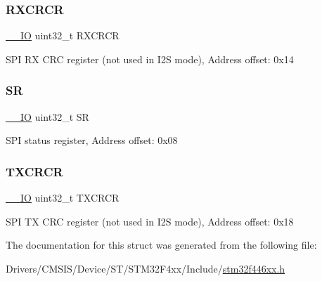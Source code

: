 \subsubsection{\texorpdfstring{R\+X\+C\+R\+CR}{RXCRCR}}
{\footnotesize\ttfamily \mbox{\hyperlink{core__sc300_8h_aec43007d9998a0a0e01faede4133d6be}{\+\_\+\+\_\+\+IO}} uint32\+\_\+t R\+X\+C\+R\+CR}

S\+PI RX C\+RC register (not used in I2S mode), Address offset\+: 0x14 \mbox{\label{struct_s_p_i___type_def_af6aca2bbd40c0fb6df7c3aebe224a360}} 
\subsubsection{\texorpdfstring{SR}{SR}}
{\footnotesize\ttfamily \mbox{\hyperlink{core__sc300_8h_aec43007d9998a0a0e01faede4133d6be}{\+\_\+\+\_\+\+IO}} uint32\+\_\+t SR}

S\+PI status register, Address offset\+: 0x08 \mbox{\label{struct_s_p_i___type_def_ab4e4328504fd66285df8264d410deefd}} 
\subsubsection{\texorpdfstring{T\+X\+C\+R\+CR}{TXCRCR}}
{\footnotesize\ttfamily \mbox{\hyperlink{core__sc300_8h_aec43007d9998a0a0e01faede4133d6be}{\+\_\+\+\_\+\+IO}} uint32\+\_\+t T\+X\+C\+R\+CR}

S\+PI TX C\+RC register (not used in I2S mode), Address offset\+: 0x18 

The documentation for this struct was generated from the following file\+:\begin{DoxyCompactItemize}
\item 
Drivers/\+C\+M\+S\+I\+S/\+Device/\+S\+T/\+S\+T\+M32\+F4xx/\+Include/\mbox{\hyperlink{stm32f446xx_8h}{stm32f446xx.\+h}}\end{DoxyCompactItemize}
